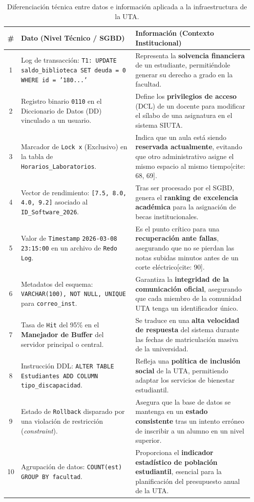 \documentclass{article}
\begin{document}
\begin{table}[H]
\centering
\small
\begin{tabular}{|c|p{5cm}|p{8cm}|}
\hline
\rowcolor[HTML]{C0C0C0} 
\textbf{\#} & \textbf{Dato (Nivel Técnico / SGBD)} & \textbf{Información (Contexto Institucional)} \\ \hline
1  & Log de transacción: \texttt{T1: UPDATE saldo\_biblioteca SET deuda = 0 WHERE id = '180...'} & Representa la \textbf{solvencia financiera} de un estudiante, permitiéndole generar su derecho a grado en la facultad. \\ \hline
2  & Registro binario \texttt{0110} en el Diccionario de Datos (DD) vinculado a un usuario. & Define los \textbf{privilegios de acceso} (DCL) de un docente para modificar el sílabo de una asignatura en el sistema SIUTA. \\ \hline
3  & Marcador de \texttt{Lock x} (Exclusivo) en la tabla de \texttt{Horarios\_Laboratorios}. & Indica que un aula está siendo \textbf{reservada actualmente}, evitando que otro administrativo asigne el mismo espacio al mismo tiempo[cite: 68, 69]. \\ \hline
4  & Vector de rendimiento: \texttt{[7.5, 8.0, 4.0, 9.2]} asociado al \texttt{ID\_Software\_2026}. & Tras ser procesado por el SGBD, genera el \textbf{ranking de excelencia académica} para la asignación de becas institucionales. \\ \hline
5  & Valor de \texttt{Timestamp} \texttt{2026-03-08 23:15:00} en un archivo de \texttt{Redo Log}. & Es el punto crítico para una \textbf{recuperación ante fallas}, asegurando que no se pierdan las notas subidas minutos antes de un corte eléctrico[cite: 90]. \\ \hline
6  & Metadatos del esquema: \texttt{VARCHAR(100), NOT NULL, UNIQUE} para \texttt{correo\_inst}. & Garantiza la \textbf{integridad de la comunicación oficial}, asegurando que cada miembro de la comunidad UTA tenga un identificador único. \\ \hline
7  & Tasa de \texttt{Hit} del 95\% en el \textbf{Manejador de Buffer} del servidor principal o central. & Se traduce en una \textbf{alta velocidad de respuesta} del sistema durante las fechas de matriculación masiva de la universidad. \\ \hline
8  & Instrucción DDL: \texttt{ALTER TABLE Estudiantes ADD COLUMN tipo\_discapacidad}. & Refleja una \textbf{política de inclusión social} de la UTA, permitiendo adaptar los servicios de bienestar estudiantil. \\ \hline
9  & Estado de \texttt{Rollback} disparado por una violación de restricción (\textit{constraint}). & Asegura que la base de datos se mantenga en un \textbf{estado consistente} tras un intento erróneo de inscribir a un alumno en un nivel superior. \\ \hline
10 & Agrupación de datos: \texttt{COUNT(est) GROUP BY facultad}. & Proporciona el \textbf{indicador estadístico de población estudiantil}, esencial para la planificación del presupuesto anual de la UTA. \\ \hline
\end{tabular}
\caption{Diferenciación técnica entre datos e información aplicada a la infraestructura de la UTA.}
\end{table}
\end{document}
